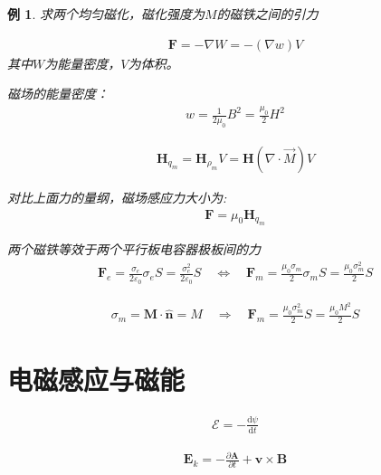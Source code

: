 \documentclass[12pt,onecolumn,a4paper]{book}
\newenvironment{block}[1]{
    \begin{tcolorbox}[colback=blue!5!white,colframe=blue!75!black,title=#1]
}{
    \end{tcolorbox}
}
\newtheorem*{example}{例}
\numberwithin{table}{subsection}
\numberwithin{equation}{subsection}
\begin{document}
    \begin{example}
        求两个均匀磁化，磁化强度为$M$的磁铁之间的引力


        \begin{align}
            \mathbf{F} = -\nabla W = -(\nabla w)V
        \end{align}
        其中$W$为能量密度，$V$为体积。

        磁场的能量密度：
        \begin{align}
            w = \frac{1}{2\mu_0}B^2 = \frac{\mu_0}{2} H^2
        \end{align}

        \begin{align}
            \mathbf{H}_{q_m} = \mathbf{H}_{\rho_m}V = \mathbf{H} (\nabla \cdot \vec{M} ) V
        \end{align}

        对比上面力的量纲，磁场感应力大小为:
        \begin{align}
            \mathbf{F} = \mu_0 \mathbf{H}_{q_m}
        \end{align}

        两个磁铁等效于两个平行板电容器极板间的力
        \begin{align}
            \mathbf{F}_e = \frac{\sigma_e}{2 \varepsilon_0} \sigma_e S = \frac{\sigma_e^2}{2 \varepsilon_0}S \quad \Longleftrightarrow \quad \mathbf{F}_m = \frac{\mu_0\sigma_m}{2} \sigma_m S = \frac{\mu_0 \sigma_m^2}{2} S
        \end{align}

        \begin{align}
            \sigma_m = \mathbf{M} \cdot \hat{\mathbf{n}} = M \quad \Rightarrow \quad \mathbf{F}_m = \frac{\mu_0 \sigma_m^2}{2} S = \frac{\mu_0 M^2}{2} S
        \end{align}
    \end{example}

    \chapter{电磁感应与磁能}

    \begin{block}{Faraday电磁感应定律}
        \begin{align}
            \mathcal{E} = - \frac{\mathrm{d} \psi}{\mathrm{d} t}
        \end{align}
    \end{block}

    \begin{block}{感应电场}
        \begin{align}
            \mathbf{E}_k = - \frac{\partial \mathbf{A}}{\partial t} + \mathbf{v} \times \mathbf{B}
        \end{align}
    \end{block}
\end{document}
